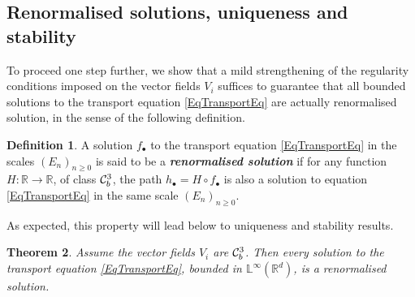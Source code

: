 \documentclass[11pt,a4paper]{amsart}
\newcommand{\RR}{\mathbb{R}}  \newcommand{\CC}{\mathbb{C}}  \newcommand{\LL}{\mathbb{L}}  \newcommand{\WW}{\mathbb{W}}
\renewcommand{\geq}{\geqslant}
\theoremstyle{plain}%
\newtheorem{theorem}{Theorem}
\theoremstyle{definition}
\newtheorem{definition}[theorem]{Definition}
\theoremstyle{remark}
\numberwithin{equation}{section} %
\begin{document}
\subsection{Renormalised solutions, uniqueness and stability}
\label{SubsectionrenormalisedSolutions}

To proceed one step further, we show that a mild strengthening of the regularity conditions imposed on the vector fields $V_i$ suffices to guarantee that all bounded solutions to the transport equation \eqref{EqTransportEq} are actually renormalised solution, in the sense of the following definition. 

\begin{definition}
\label{DefnrenormalisedSolutions}
A solution $f_\bullet$ to the transport equation \eqref{EqTransportEq} in the scales $(E_n)_{n\geq 0}$ is said to be a \emph{\bf renormalised solution} if for any function $H : \RR\rightarrow\RR$, of class $\mathcal{C}^3_b$, the path $h_\bullet = H\circ f_\bullet$ is also a solution to equation \eqref{EqTransportEq} in the same scale $(E_n)_{n\geq 0}$.
\end{definition}

As expected, this property will lead below to uniqueness and stability results.

\begin{theorem}
\label{ThmRenomalizedSolutions}
Assume the vector fields $V_i$ are $\mathcal{C}^3_b$. Then every solution to the transport equation \eqref{EqTransportEq}, bounded in $ \LL^\infty(\RR^d)$, is a renormalised solution.
\end{theorem}
 
\medskip
 
\end{document}
